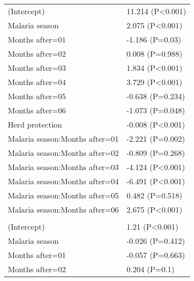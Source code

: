 \documentclass[]{article}
\begin{document}
\begin{longtable}[t]{ll}
\hspace{1em}(Intercept) & 11.214 (P<0.001)\\
\hspace{1em}Malaria season & 2.075 (P<0.001)\\
\hspace{1em}Months after=01 & -1.186 (P=0.03)\\
\hspace{1em}Months after=02 & 0.008 (P=0.988)\\
\hspace{1em}Months after=03 & 1.834 (P<0.001)\\
\hspace{1em}Months after=04 & 3.729 (P<0.001)\\
\hspace{1em}Months after=05 & -0.638 (P=0.234)\\
\hspace{1em}Months after=06 & -1.073 (P=0.048)\\
\hspace{1em}Herd protection & -0.008 (P<0.001)\\
\hspace{1em}Malaria season:Months after=01 & -2.221 (P=0.002)\\
\hspace{1em}Malaria season:Months after=02 & -0.809 (P=0.268)\\
\hspace{1em}Malaria season:Months after=03 & -4.124 (P<0.001)\\
\hspace{1em}Malaria season:Months after=04 & -6.491 (P<0.001)\\
\hspace{1em}Malaria season:Months after=05 & 0.482 (P=0.518)\\
\hspace{1em}Malaria season:Months after=06 & 2.675 (P<0.001)\\
\addlinespace[1.5em]
\multicolumn{2}{l}{\textbf{Temporary field worker}}\\
\hspace{1em}(Intercept) & 1.21 (P<0.001)\\
\hspace{1em}Malaria season & -0.026 (P=0.412)\\
\hspace{1em}Months after=01 & -0.057 (P=0.663)\\
\hspace{1em}Months after=02 & 0.204 (P=0.1)\\

\end{longtable}
\end{document}
